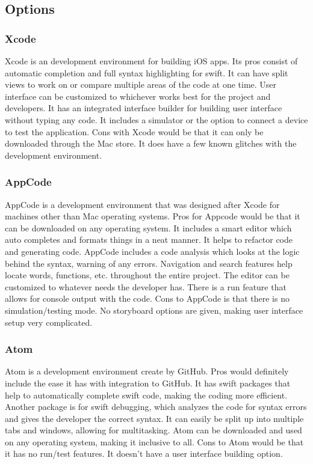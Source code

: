 \documentclass[letterpaper,10pt,draftclsnofoot,onecolumn,compsoc]{IEEEtran}
\begin{document}
\subsection{Options}


\subsubsection{Xcode}
\begin{singlespace}
\noindent
Xcode is an development environment for building iOS apps. Its pros consist of automatic completion and full syntax highlighting for swift. It can have split views to work on or compare multiple areas of the code at one time. User interface can be customized to whichever works best for the project and developers. It has an integrated interface builder for building user interface without typing any code. It includes a simulator or the option to connect a device to test the application. Cons with Xcode would be that it can only be downloaded through the Mac store. It does have a few known glitches with the development environment.
\end{singlespace}

\subsubsection{AppCode}
\begin{singlespace}
\noindent
AppCode is a development environment that was designed after Xcode for machines other than Mac operating systems. Pros for Appcode would be that it can be downloaded on any operating system. It includes a smart editor which auto completes and formats things in a neat manner. It helps to refactor code and generating code. AppCode includes a code analysis which looks at the logic behind the syntax, warning of any errors. Navigation and search features help locate words, functions, etc. throughout the entire project. The editor can be customized to whatever needs the developer has. There is a run feature that allows for console output with the code. Cons to AppCode is that there is no simulation/testing mode. No storyboard options are given, making user interface setup very complicated.
\end{singlespace}

\subsubsection{Atom}
\begin{singlespace}
\noindent
Atom is a development environment create by GitHub. Pros would definitely include the ease it has with integration to GitHub. It has swift packages that help to automatically complete swift code, making the coding more efficient. Another package is for swift debugging, which analyzes the code for syntax errors and gives the developer the correct syntax. It can easily be split up into multiple tabs and windows, allowing for multitasking. Atom can be downloaded and used on any operating system, making it inclusive to all. Cons to Atom would be that it has no run/test features. It doesn't have a user interface building option. 
\end{singlespace}
\end{document}
